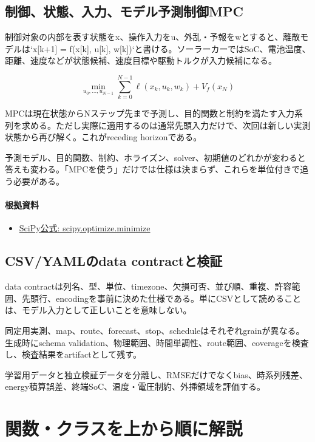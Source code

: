 \documentclass[a4paper,11pt]{article}
\begin{document}
\subsection{制御、状態、入力、モデル予測制御MPC}
制御対象の内部を表す状態をx、操作入力をu、外乱・予報をwとすると、離散モデルは`x[k+1] = f(x[k], u[k], w[k])`と書ける。ソーラーカーではSoC、電池温度、距離、速度などが状態候補、速度目標や駆動トルクが入力候補になる。


\[
\min_{u_0,\ldots,u_{N-1}} \sum_{k=0}^{N-1}\ell(x_k,u_k,w_k)+V_f(x_N)
\]

MPCは現在状態からNステップ先まで予測し、目的関数と制約を満たす入力系列を求める。ただし実際に適用するのは通常先頭入力だけで、次回は新しい実測状態から再び解く。これがreceding horizonである。


予測モデル、目的関数、制約、ホライズン、solver、初期値のどれかが変わると答えも変わる。「MPCを使う」だけでは仕様は決まらず、これらを単位付きで追う必要がある。

\paragraph{根拠資料}
\begin{itemize}[leftmargin=1.6em]
\item \href{https://docs.scipy.org/doc/scipy/reference/generated/scipy.optimize.minimize.html}{SciPy公式: scipy.optimize.minimize}
\end{itemize}

\subsection{CSV/YAMLのdata contractと検証}
data contractは列名、型、単位、timezone、欠損可否、並び順、重複、許容範囲、先頭行、encodingを事前に決めた仕様である。単にCSVとして読めることは、モデル入力として正しいことを意味しない。


同定用実測、map、route、forecast、stop、scheduleはそれぞれgrainが異なる。生成時にschema validation、物理範囲、時間単調性、route範囲、coverageを検査し、検査結果をartifactとして残す。


学習用データと独立検証データを分離し、RMSEだけでなくbias、時系列残差、energy積算誤差、終端SoC、温度・電圧制約、外挿領域を評価する。





        \section{関数・クラスを上から順に解説}
\end{document}
